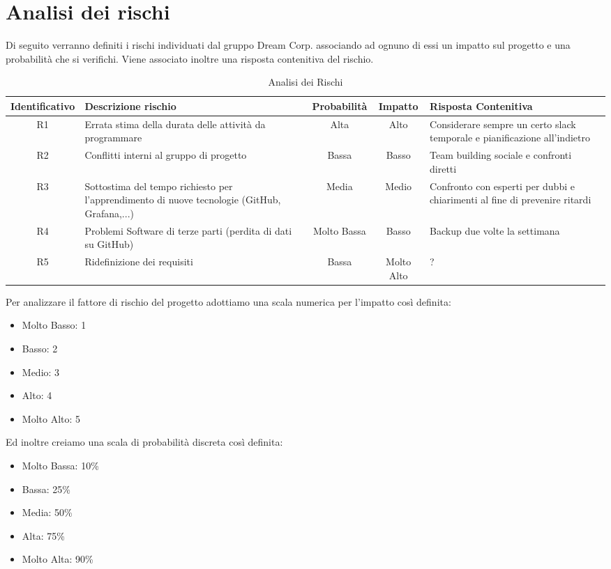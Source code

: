 \section{Analisi dei rischi}

	Di seguito verranno definiti i rischi individuati dal gruppo Dream Corp. associando ad ognuno di essi un impatto sul progetto e una probabilità che si verifichi. Viene associato inoltre una risposta contenitiva del rischio. 
	\begin{table}[h!]
		\centering
		\renewcommand{\arraystretch}{2} 
		\begin{tabular}{|c|p{3.6cm}|c|c|p{3.6cm}|}
			\rowcolor{orange!50}
			\hline
			\textbf{Identificativo} & \textbf{Descrizione rischio} & \textbf{Probabilità} & \textbf{Impatto} & \textbf{Risposta Contenitiva}\\
			\hline
			R1 & Errata stima della durata delle attività da programmare & Alta & Alto & Considerare sempre un certo slack temporale e pianificazione all’indietro\\
			\hline
			R2 & Conflitti interni al gruppo di progetto & Bassa & Basso & Team building sociale e confronti diretti\\
			\hline
			R3 & Sottostima del tempo richiesto per l’apprendimento di nuove tecnologie (GitHub, Grafana,...) & Media & Medio & Confronto con esperti per dubbi e chiarimenti al fine di prevenire ritardi\\
			\hline
			R4 & Problemi Software di terze parti (perdita di dati su GitHub) & Molto  Bassa & Basso &  Backup due volte la settimana\\
			\hline
			R5 & Ridefinizione dei requisiti & Bassa & Molto Alto & ?\\
			\hline
		\end{tabular}
		\caption{Analisi dei Rischi}
	\end{table}
	\clearpage
	Per analizzare il fattore di rischio del progetto adottiamo una scala numerica per l’impatto così definita:
	\begin{itemize}
		\item Molto Basso: 1
		\item Basso: 2
		\item Medio: 3
		\item Alto: 4
		\item Molto Alto: 5
	\end{itemize}
	Ed inoltre creiamo una scala di probabilità discreta così definita:
	\begin{itemize}
		\item Molto Bassa: 10\%
		\item Bassa: 25\%
		\item Media: 50\%
		\item Alta: 75\%
		\item Molto Alta: 90\%
	\end{itemize}
